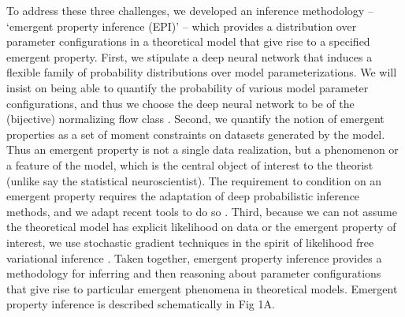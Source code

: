 \documentclass[11pt]{article}
\begin{document}
To address these three challenges, we developed an inference methodology -- `emergent property inference (EPI)' -- which provides a distribution over parameter configurations in a theoretical model that give rise to a specified emergent property.  
First, we stipulate a deep neural network that induces a flexible family of probability distributions over model parameterizations.   We will insist on being able to quantify the probability of various model parameter configurations, and thus we choose the deep neural network to be of the (bijective) normalizing flow class \cite{rezende2015variational}.
Second, we quantify the notion of emergent properties as a set of moment constraints on datasets generated by the model.  
Thus an emergent property is not a single data realization, but a phenomenon or a feature of the model, which is the central object of interest to the theorist (unlike say the statistical neuroscientist).  
The requirement to condition on an emergent property requires the adaptation of deep probabilistic inference methods, and we adapt recent tools to do so \cite{loaiza2017maximum}.
Third,  because we can not assume the theoretical model has explicit likelihood on data or the emergent property of interest, we use stochastic gradient techniques in the spirit of likelihood free variational inference \cite{tran2017hierarchical}.    
Taken together, emergent property inference provides a methodology for inferring and then reasoning about parameter configurations that give rise to particular emergent phenomena in theoretical models.   
Emergent property inference is described schematically in Fig 1A.
\end{document}
